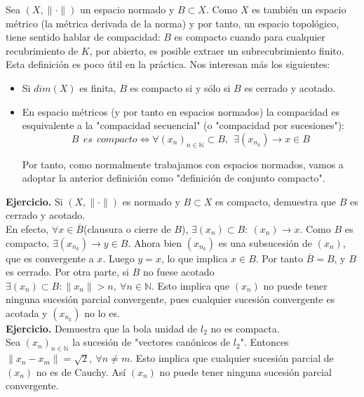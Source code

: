 \documentclass{article}
\begin{document}
Sea $(X,\|\cdot\|)$ un espacio normado y $B\subset X$. Como $X$ es también un espacio métrico (la métrica derivada de la norma) y por tanto, un espacio topológico, tiene sentido hablar de compacidad: $B$ es compacto cuando para cualquier recubrimiento de $K$, por abierto, es posible extraer un subrecubrimiento finito. Esta definición es poco útil en la práctica. Nos interesan más los siguientes:
\begin{itemize}
\item Si $dim(X)$ es finita, $B$ es compacto si y sólo si $B$ es cerrado y acotado.

\item En espacio métricos (y por tanto en espacios normados) la compacidad es esquivalente a la "compacidad secuencial" (o "compacidad por sucesiones"):
\begin{equation*}
B\:\:es\:\:compacto \Leftrightarrow \forall (x_n)_{n\in\mathbb{N}}\subset B,\:\:\exists (x_{n_k})\rightarrow x\in B
\end{equation*}

Por tanto, como normalmente trabajamos con espacios normados, vamos a adoptar la anterior definición como "definición de conjunto compacto".
\end{itemize}

\textbf{Ejercicio.} Si $(X,\|\cdot\|)$ es normado y $B\subset X$ es compacto, demuestra que $B$ es cerrado y acotado.\\

En efecto, $\forall x\in \overline{B}$(clausura o cierre de $B$), $\exists (x_n)\subset B:\:(x_n)\rightarrow x$. Como $B$ es compacto, $\exists (x_{n_k})\rightarrow y\in B$. Ahora bien $(x_{n_k})$ es una subsucesión de $(x_n)$, que es convergente a $x$. Luego $y=x$, lo que implica $x\in B$. Por tanto $\overline{B}=B$, y $B$ es cerrado. Por otra parte, si $B$ no fuese acotado $\exists (x_n)\subset B:\|x_n\|>n,\:\forall n\in \mathbb{N}$. Esto implica que $(x_n)$ no puede tener ninguna sucesión parcial convergente, pues cualquier sucesión convergente es acotada y $(x_{n_k})$ no lo es.\\

\textbf{Ejercicio.} Demuestra que la bola unidad de $l_2$ no es compacta.\\

Sea $(x_n)_{n\in \mathbb{N}}$ la sucesión de "vectores canónicos de $l_2$". Entonces $\|x_n-x_m\|=\sqrt{2},\:\forall n\neq m$. Esto implica que cualquier sucesión parcial de $(x_n)$ no es de Cauchy. Así $(x_n)$ no puede tener ninguna sucesión parcial convergente.\\
\end{document}
